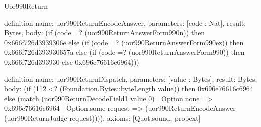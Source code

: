 \begin{lexlean}{Uor990Return}
\begin{semanticmodule}
definition{
  name: uor990ReturnEncodeAnswer,
  parameters: [code : Nat],
  result: Bytes,
  body: (if (code =? (uor990ReturnAnswerForm990n)) then 0x666f726d3939306e else (if (code =? (uor990ReturnAnswerForm990ez)) then 0x666f726d393930657a else (if (code =? (uor990ReturnAnswerForm990)) then 0x666f726d393930 else 0x696e76616c6964)))
}

definition{
  name: uor990ReturnDispatch,
  parameters: [value : Bytes],
  result: Bytes,
  body: (if (112 <? (Foundation.Bytes::byteLength value)) then 0x696e76616c6964 else (match (uor990ReturnDecodeField1 value 0)
    | Option.none => 0x696e76616c6964
    | Option.some request => (uor990ReturnEncodeAnswer (uor990ReturnJudge request)))),
  axioms: [Quot.sound, propext]
}
\end{semanticmodule}
\end{lexlean}

